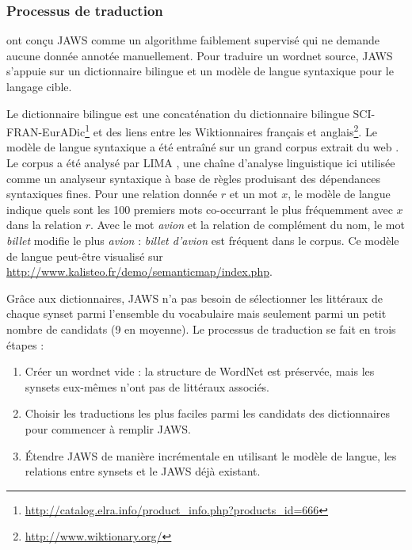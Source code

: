 \subsubsection{Processus de traduction}
\label{subsec:translation_process}

\cite{mouton2010jaws} ont conçu JAWS comme un algorithme faiblement supervisé
qui ne demande aucune donnée annotée manuellement. Pour traduire un wordnet
source, JAWS s'appuie sur un dictionnaire bilingue et un modèle de langue
syntaxique pour le langage cible.

Le dictionnaire bilingue est une concaténation du dictionnaire bilingue
SCI-FRAN-EurADic\footnote{\url{http://catalog.elra.info/product_info.php?products_id=666}}
et des liens entre les Wiktionnaires français et
anglais\footnote{\url{http://www.wiktionary.org/}}. Le modèle de langue
syntaxique a été entraîné sur un grand corpus extrait du web
\citep{grefenstette2007conquering}. Le corpus a été analysé par LIMA
\citep{besancon2010lima}, une chaîne d'analyse linguistique ici utilisée comme
un analyseur syntaxique à base de règles produisant des dépendances syntaxiques
fines. Pour une relation donnée $r$ et un mot $x$, le modèle de langue indique
quels sont les 100 premiers mots co-occurrant le plus fréquemment avec $x$ dans
la relation $r$. Avec le mot \textit{avion} et la relation de complément du
nom, le mot \textit{billet} modifie le plus \textit{avion} : \textit{billet
d'avion} est fréquent dans le corpus. Ce modèle de langue peut-être visualisé
sur \url{http://www.kalisteo.fr/demo/semanticmap/index.php}.

Grâce aux dictionnaires, JAWS n'a pas besoin de sélectionner les littéraux de chaque synset parmi l'ensemble du vocabulaire mais seulement parmi un petit nombre de candidats (9 en moyenne). Le processus de traduction se fait en trois étapes :
\begin{enumerate}
    \item Créer un wordnet vide : la structure de WordNet est préservée, mais les synsets eux-mêmes n'ont pas de littéraux associés.
    \item Choisir les traductions les plus faciles parmi les candidats des dictionnaires pour commencer à remplir JAWS.
    \item Étendre JAWS de manière incrémentale en utilisant le modèle de langue, les relations entre synsets et le JAWS déjà existant.
\end{enumerate}

